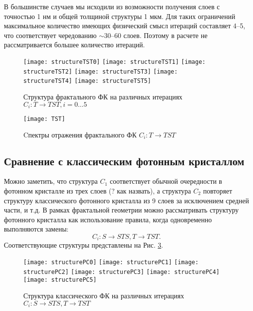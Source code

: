 \documentclass[a4paper, 12pt, oneside]{article}
\begin{document}
В большинстве случаев мы исходили из возможности получения слоев с точностью 1 нм и общей толщиной структуры 1 мкм. Для таких ограничений максимальное количество имеющих физический смысл итераций составляет 4--5, что соответствует чередованию $\sim$30--60 слоев. Поэтому в расчете не рассматривается большее количество итераций.

\begin{figure}[h!]
	\centering
	\texttt{[image: structureTST0]}
	\texttt{[image: structureTST1]}
	\texttt{[image: structureTST2]}
	\texttt{[image: structureTST3]}
	\texttt{[image: structureTST4]}
	\texttt{[image: structureTST5]}
	\caption{Структура фрактального ФК на различных итерациях $C_i: T \rightarrow TST, i = 0 \dots 5$}
	\label{fig:structureTST}
\end{figure}

\begin{figure}[h!]
	\centering
	\texttt{[image: TST]}
	\caption{Cпектры отражения фрактального ФК $C_i: T \rightarrow TST$}
	\label{fig:spectraTST}
\end{figure}

\subsection{Сравнение с классическим фотонным кристаллом}

Можно заметить, что структура $C_1$ соответствует обычной очередности в фотонном кристалле из трех слоев (? как назвать), а структура $C_2$ повторяет структуру классического фотонного кристалла из 9 слоев за исключением средней части, и т.\:д. В рамках фрактальной геометрии можно рассматривать структуру фотонного кристалла как использование правила, когда одновременно выполняются замены:
$$C_i: S \rightarrow STS, T \rightarrow TST.$$ Соответствующие структуры представлены на Рис. \ref{fig:structurePC}.

\begin{figure}[h!]
	\centering
	\texttt{[image: structurePC0]}
	\texttt{[image: structurePC1]}
	\texttt{[image: structurePC2]}
	\texttt{[image: structurePC3]}
	\texttt{[image: structurePC4]}
	\texttt{[image: structurePC5]}
	\caption{Структура классического ФК на различных итерациях $C_i: S \rightarrow STS, T \rightarrow TST$}
	\label{fig:structurePC}
\end{figure}
\end{document}
